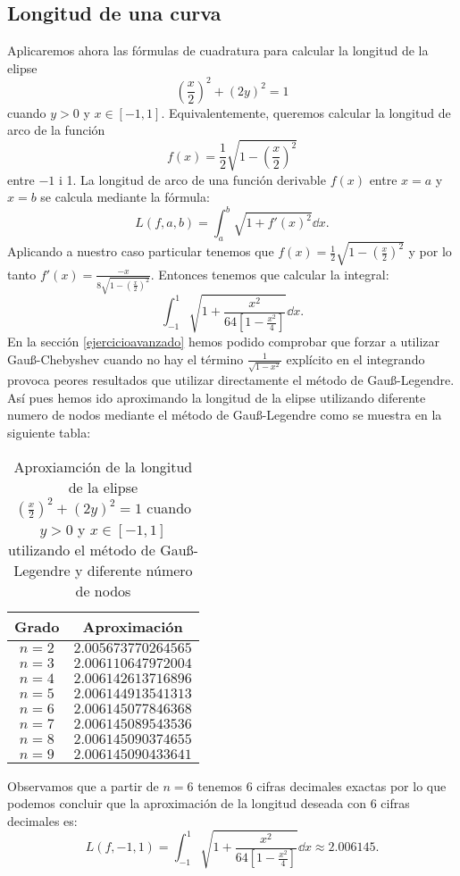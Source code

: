 \documentclass[a4paper]{article}
\begin{document}
\subsection*{Longitud de una curva}
Aplicaremos ahora las fórmulas de cuadratura para calcular la longitud de la elipse $$\left(\frac{x}{2}\right)^2+(2y)^2=1$$ cuando $y>0$ y $x\in[-1,1]$. Equivalentemente, queremos calcular la longitud de arco de la función $$f(x)=\frac{1}{2}\sqrt{1-\left(\frac{x}{2}\right)^2}$$ entre $-1$ i 1. La longitud de arco de una función derivable $f(x)$ entre $x=a$ y $x=b$ se calcula mediante la fórmula: $$L(f,a,b)=\int_a^b\sqrt{1+f'(x)^2}\dd x.$$ Aplicando a nuestro caso particular tenemos que $f(x)=\frac{1}{2}\sqrt{1-\left(\frac{x}{2}\right)^2}$ y por lo tanto $f'(x)=\frac{-x}{8\sqrt{1-\left(\frac{x}{2}\right)^2}}$. Entonces tenemos que calcular la integral: $$\int_{-1}^1\sqrt{1+\frac{x^2}{64\left[1-\frac{x^2}{4}\right]}}\dd x.$$ En la sección \ref{ejercicioavanzado} hemos podido comprobar que forzar a utilizar Gau\ss-Chebyshev cuando no hay el término $\frac{1}{\sqrt{1-x^2}}$ explícito en el integrando provoca peores resultados que utilizar directamente el método de Gau\ss-Legendre. Así pues hemos ido aproximando la longitud de la elipse utilizando diferente numero de nodos mediante el método de Gau\ss-Legendre como se muestra en la siguiente tabla:
\begin{table}[ht]
    \centering
    \begin{tabular}{|c|c|}
        \hline
        Grado & Aproximación\\
        \hline
        $n=2$ & $2.005673770264565$ \\
        \hline
        $n=3$ & $2.006110647972004$ \\
        \hline
        $n=4$ & $2.006142613716896$ \\
        \hline
        $n=5$ & $2.006144913541313$ \\
        \hline
        $n=6$ & $2.006145077846368$ \\
        \hline
        $n=7$ & $2.006145089543536$ \\
        \hline
        $n=8$ & $2.006145090374655$ \\
        \hline
        $n=9$ & $2.006145090433641$ \\
        \hline
    \end{tabular}
    \caption{Aproxiamción de la longitud de la elipse $\left(\frac{x}{2}\right)^2+(2y)^2=1$ cuando $y>0$ y $x\in[-1,1]$ utilizando el método de Gau\ss-Legendre y diferente número de nodos}
\end{table}\par
Observamos que a partir de $n=6$ tenemos 6 cifras decimales exactas por lo que podemos concluir que la aproximación de la longitud deseada con 6 cifras decimales es: $$L(f,-1,1)=\int_{-1}^1\sqrt{1+\frac{x^2}{64\left[1-\frac{x^2}{4}\right]}}\dd x\approx 2.006145.$$
\end{document}
